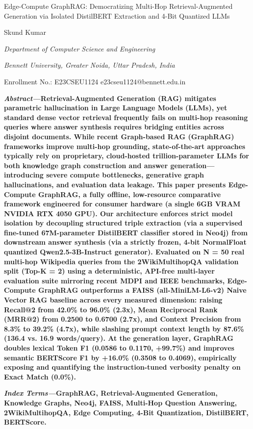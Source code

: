 Edge-Compute GraphRAG: Democratizing Multi-Hop Retrieval-Augmented
Generation via Isolated DistilBERT Extraction and 4-Bit Quantized LLMs

Skund Kumar

\emph{Department of Computer Science and Engineering}

\emph{Bennett University, Greater Noida, Uttar Pradesh, India}

Enrollment No.: E23CSEU1124 \textbar{} e23cseu1124@bennett.edu.in

\textbf{\emph{Abstract---}Retrieval-Augmented Generation (RAG) mitigates
parametric hallucination in Large Language Models (LLMs), yet standard
dense vector retrieval frequently fails on multi-hop reasoning queries
where answer synthesis requires bridging entities across disjoint
documents. While recent Graph-based RAG (GraphRAG) frameworks improve
multi-hop grounding, state-of-the-art approaches typically rely on
proprietary, cloud-hosted trillion-parameter LLMs for both knowledge
graph construction and answer generation---introducing severe compute
bottlenecks, generative graph hallucinations, and evaluation data
leakage. This paper presents Edge-Compute GraphRAG, a fully offline,
low-resource comparative framework engineered for consumer hardware (a
single 6GB VRAM NVIDIA RTX 4050 GPU). Our architecture enforces strict
model isolation by decoupling structured triple extraction (via a
supervised fine-tuned 67M-parameter DistilBERT classifier stored in
Neo4j) from downstream answer synthesis (via a strictly frozen, 4-bit
NormalFloat quantized Qwen2.5-3B-Instruct generator). Evaluated on N =
50 real multi-hop Wikipedia queries from the 2WikiMultihopQA validation
split (Top-K = 2) using a deterministic, API-free multi-layer evaluation
suite mirroring recent MDPI and IEEE benchmarks, Edge-Compute GraphRAG
outperforms a FAISS (all-MiniLM-L6-v2) Naive Vector RAG baseline across
every measured dimension: raising Recall@2 from 42.0\% to 96.0\% (2.3x),
Mean Reciprocal Rank (MRR@2) from 0.2500 to 0.6700 (2.7x), and Context
Precision from 8.3\% to 39.2\% (4.7x), while slashing prompt context
length by 87.6\% (136.4 vs. 16.9 words/query). At the generation layer,
GraphRAG doubles lexical Token F1 (0.0586 to 0.1170, +99.7\%) and
improves semantic BERTScore F1 by +16.0\% (0.3508 to 0.4069),
empirically exposing and quantifying the instruction-tuned verbosity
penalty on Exact Match (0.0\%).}

\textbf{\emph{Index Terms---}GraphRAG, Retrieval-Augmented Generation,
Knowledge Graphs, Neo4j, FAISS, Multi-Hop Question Answering,
2WikiMultihopQA, Edge Computing, 4-Bit Quantization, DistilBERT,
BERTScore.}

